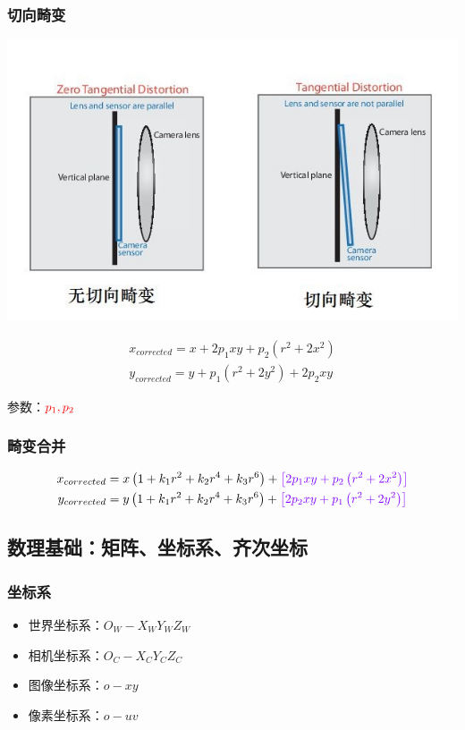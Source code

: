 \documentclass[aspectratio=43]{beamer}
\begin{document}
\begin{frame}
	\frametitle{切向畸变}
	\begin{center}
		\includegraphics[scale=0.35]{切向畸变.jpg}
	\end{center}
	\vspace{-0.6em}
	\begin{gather}
		x_{corrected}=x+2p_1xy+p_2\left( r^2+2x^2 \right) 
		\\
		y_{corrected}=y+p_1\left( r^2+2y^2 \right) +2p_2xy
	\end{gather}
	\begin{center}
		参数：${\color[RGB]{240, 0, 0} p_1,p_2}$
	\end{center}
\end{frame}

\begin{frame}
	\frametitle{畸变合并}
	\begin{gather}
		x_{corrected}=x\left( 1+k_1r^2+k_2r^4+k_3r^6 \right) +{\color[RGB]{128, 0, 255} \left[ 2p_1xy+p_2\left( r^2+2x^2 \right) \right] }
		\\
		y_{corrected}=y\left( 1+k_1r^2+k_2r^4+k_3r^6 \right) +{\color[RGB]{128, 0, 255} \left[ 2p_2xy+p_1\left( r^2+2y^2 \right) \right] }	
	\end{gather}
\end{frame}


		
	\subsection{数理基础：矩阵、坐标系、齐次坐标}
		
\begin{frame}	
	\frametitle{坐标系}
	\begin{itemize}
		\item 世界坐标系：$O_{W} -X_{W} Y_{W} Z_{W} $
		\item 相机坐标系：$O_{C} -X_{C} Y_{C} Z_{C} $
		\item 图像坐标系：$o-xy$
		\item 像素坐标系：$o-uv $
	\end{itemize}
\end{frame}
\end{document}

